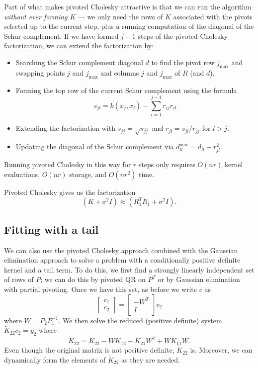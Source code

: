 \documentclass[12pt, leqno]{article} %
\begin{document}
Part of what makes pivoted Cholesky attractive is that we can run
the algorithm {\em without ever forming $K$} --- we only need the rows
of $K$ associated with the pivots selected up to the current step,
plus a running computation of the diagonal of the Schur complement.
If we have formed $j-1$ steps of the pivoted Cholesky factorization,
we can extend the factorization by:
\begin{itemize}
\item Searching the Schur complement diagonal $d$ to find
  the pivot row $j_{\max}$ and swapping points $j$ and
  $j_{\max}$ and columns $j$ and $j_{\max}$ of $R$ (and $d$).
\item Forming the top row of the current Schur complement using the formula
  \[
    s_{jl} = k(x_j, x_l) - \sum_{i=1}^{j-1} r_{ij} r_{il}
  \]
\item Extending the factorization with $s_{jj} = \sqrt{s_{jj}}$ and 
  $r_{jl} = s_{jl} / r_{jj}$ for $l > j$.
\item Updating the diagonal of the Schur complement via
  $d_{ll}^{\mathrm{new}} = d_{ll} - r_{jl}^2$.
\end{itemize}
Running pivoted Cholesky in this way for $r$ steps only requires
$O(nr)$ kernel evaluations, $O(nr)$ storage, and $O(nr^2)$ time.

Pivoted Cholesky gives us the factorization
\[
  (K+\sigma^2 I) \approx (R_1^T R_1 + \sigma^2 I).
\]

\subsection{Fitting with a tail}

We can also use the pivoted Cholesky approach combined with the
Gaussian elimination approach to solve a problem with
a conditionally positive definite kernel and a tail term.  To do this,
we first find a strongly linearly independent set of rows of $P$; we
can do this by pivoted QR on $P^T$ or by Gaussian elimination with
partial pivoting.  Once we have this set, as before we write $c$ as
\[
  \begin{bmatrix} c_1 \\ c_2 \end{bmatrix} =
  \begin{bmatrix} -W^T \\ I \end{bmatrix} c_2
\]
where $W = P_2 P_1^{-1}$.  We then  
solve the reduced (positive definite) system $\tilde{K}_{22} c_2 = y_2$
where
\[
  \tilde{K}_{22} = K_{22} - W K_{12} - K_{21} W^T + W K_{11} W.
\]
Even though the original matrix is not positive definite,
$\tilde{K}_{22}$ is.  Moreover, we can dynamically form the elements
of $\tilde{K}_{22}$ as they are needed.
\end{document}
